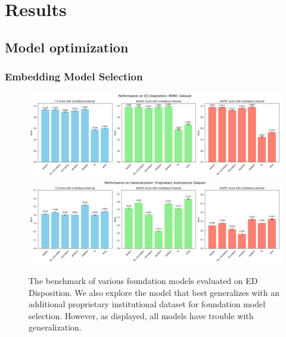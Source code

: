 \documentclass[pmlr]{jmlr}%
\begin{document}


\section{Results}


\subsection{Model optimization}


\subsubsection{Embedding Model Selection}

 \begin{figure}[h!]
   \centering 
   \includegraphics[width=\textwidth]{fm_eval.png} 
    \includegraphics[width=\textwidth]{generalize.png} 
    \vspace*{-0.5cm}
   \caption{The benchmark of various foundation models evaluated on ED Disposition. We also explore the model that best generalizes with an additional proprietary institutional dataset for foundation model selection. However, as displayed, all models have trouble with generalization.}
   \label{fm} 
 \end{figure} 
\vspace*{-0.5cm}
\end{document}
